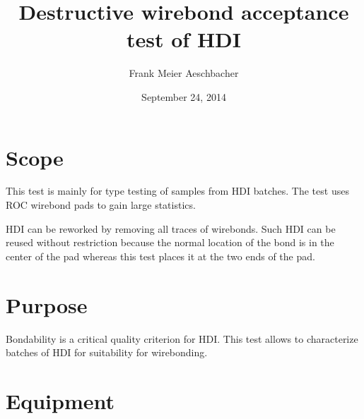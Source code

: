 \documentclass[10pt]{unlsilabsop}
\title{Destructive wirebond acceptance test of HDI}
\date{September 24, 2014}
\author{Frank Meier Aeschbacher}
\begin{document}
\maketitle

\section{Scope}
This test is mainly for type testing of samples from HDI batches. The test uses ROC wirebond pads to gain large statistics.

HDI can be reworked by removing all traces of wirebonds. Such HDI can be reused without restriction because the normal location of the bond is in the center of the pad whereas this test places it at the two ends of the pad.

\section{Purpose}
Bondability is a critical quality criterion for HDI. This test allows to characterize batches of HDI for suitability for wirebonding.



\section{Equipment}
\end{document}
